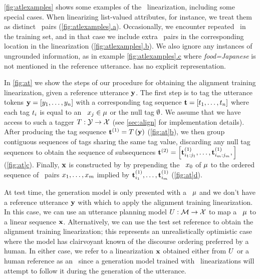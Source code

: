 

\autoref{fig:atlexamples} shows some examples of the
\alignmenttraining~linearization, including some special cases. When
linearizing list-valued attributes, for instance, we treat them as distinct
\attributevalue~pairs
(\hyperref[fig:atlexamples]{\autoref{fig:atlexamples}.a}). Occasionally, we
encounter repeated \attributevalues~in the training set, and in that case we
include extra \attributevalue~pairs in the corresponding location in the
linearization (\hyperref[fig:atlexamples]{\autoref{fig:atlexamples}.b}). We
also ignore any instances of  ungrounded information, as in example
\hyperref[fig:atlexamples]{\autoref{fig:atlexamples}.c} where
\textit{food=Japanese} is not mentioned in the reference utterance.  has no
explicit representation.  

In \autoref{fig:at} we show the steps of our procedure for obtaining the
alignment training linearization, given a reference utterance $\mathbf{y}$.  The
first step is to tag the utterance tokens $\mathbf{y} =
\left[y_1,\ldots,y_n\right]$ with a corresponding tag
sequence $\mathbf{t}=\left[t_1,\ldots, t_n\right]$ where each tag
$t_i$ is equal to an \attributevalue~$x_j \in \mu$ or the null tag
$\emptyset$. We assume that we have access to such a tagger $T : \mathcal{Y}
\rightarrow \mathcal{X}$ (see \autoref{sec:align} for implementation details).
After producing the tag sequence $\mathbf{t}^{(1)} = T\left(\mathbf{y}\right)$
(\hyperref[fig:at]{\autoref{fig:at}b}), we then group contiguous sequences of
tags sharing the same tag value, discarding any null tag sequences to obtain
the sequence of subsequences $\mathbf{t}^{(2)} =
\left[\mathbf{t}^{(1)}_{i_1:j_1},\ldots,\mathbf{t}^{(1)}_{i_{m}:j_{m}},
\right]$ (\hyperref[fig:at]{\autoref{fig:at}c}).  Finally, $\mathbf{x}$ is
constructed by by prepending the \dialogueact~$x_0$ of $\mu$ to the
ordered sequence of \attributevalue~pairs $x_1,\ldots,x_{m}$
implied by $\mathbf{t}^{(1)}_{i_1},\ldots,\mathbf{t}^{(1)}_{i_{m}}$
(\hyperref[fig:at]{\autoref{fig:at}d}). 



At test time, the generation model is only presented with a
\meaningrepresentation~$\mu$ and we don't have a reference utterance $\mathbf{y}$
with which to apply the alignment training linearization. In this case, we can
use an utterance planning model $U : \mathcal{M} \rightarrow \mathcal{X}$ to
map a \meaningrepresentation~$\mu$ to a linear sequence $\mathbf{x}$.
Alternatively, we can use the test set reference to obtain the alignment
training linearization; this represents an unrealistically optimistic case
where the model has clairvoyant known of the discourse ordering preferred by a
human.  In either case, we refer to a linearization $\mathbf{x}$ obtained either
from $U$ or a human reference as an \utteranceplan~since a generation
model trained with \alignmenttraining~linearizations will attempt to follow it
during the generation of the utterance.

